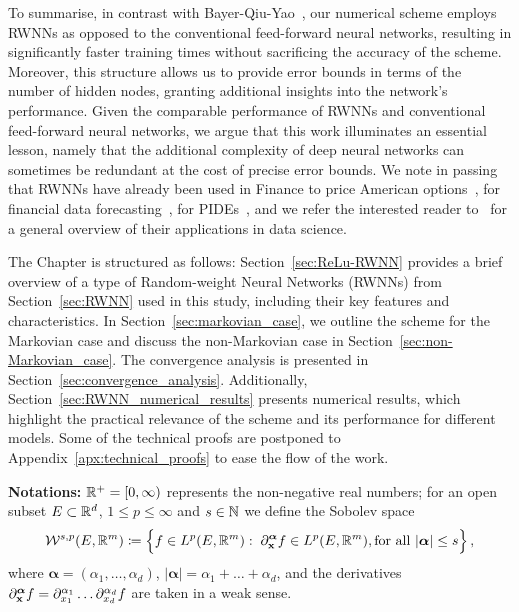 To summarise, in contrast with Bayer-Qiu-Yao~\cite{Bayer2022PricingSPDEs}, our numerical scheme employs RWNNs as opposed to the conventional feed-forward neural networks, resulting in significantly faster training times without sacrificing the accuracy of the scheme. 
Moreover, this structure allows us to provide error bounds in terms of the number of hidden nodes, granting additional insights into the network's performance. Given the comparable performance of RWNNs and conventional feed-forward neural networks, we argue that this work illuminates an essential lesson, namely that the additional complexity of deep neural networks can sometimes be redundant at the cost of precise error bounds.
We note in passing that RWNNs have already been used in Finance to price American options~\cite{Herrera2021OptimalNetworks}, 
for financial data forecasting~\cite{Liu2018FinancialNetwork}, for PIDEs~\cite{Gonon2023DeepEquations},
and we refer the interested reader to~\cite{Cao2018AWeights} for a general overview of their applications in data science.

The Chapter is structured as follows: Section~\ref{sec:ReLu-RWNN} provides a brief overview of a type of Random-weight Neural Networks (RWNNs) from Section~\ref{sec:RWNN} used in this study, including their key features and characteristics. 
In Section~\ref{sec:markovian_case}, we outline the scheme for the Markovian case and discuss the non-Markovian case in Section~\ref{sec:non-Markovian_case}.
The convergence analysis is presented in Section~\ref{sec:convergence_analysis}. Additionally, Section~\ref{sec:RWNN_numerical_results} presents numerical results, which highlight the practical relevance of the scheme and its performance for different models.
Some of the technical proofs are postponed to Appendix~\ref{apx:technical_proofs} to ease the flow of the work.


\textbf{Notations:}
$\mathbb{R}^+ = [0,\infty)$ represents the non-negative real numbers;
for an open subset $E\subset \mathbb{R}^d$, 
$1\leq p \leq \infty$ and $s \in \mathbb{N}$ 
we define the Sobolev space
$$
\mathcal{W}^{s, p}(E, \mathbb{R}^m)
\coloneqq  \Big\{f \in L^p(E, \mathbb{R}^m): \; \partial_{\mathbf{x}}^{\boldsymbol{\alpha}} f \in L^p(E, \mathbb{R}^m), \text{for all } |\boldsymbol{\alpha}| \leq s\Big\}\,,
$$
where $\boldsymbol{\alpha} = \left(\alpha_1, \ldots, \alpha_d\right)$, $|\boldsymbol{\alpha}|=\alpha_1+\ldots+\alpha_d$, and the derivatives $\partial_{\mathbf{x}}^{\boldsymbol{\alpha}} f = \partial_{x_1}^{\alpha_1} \dots \partial_{x_d}^{\alpha_d} f$ are taken in a weak sense.

